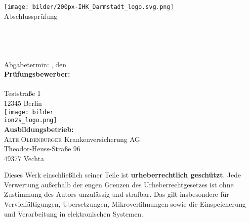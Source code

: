 
\thispagestyle{plain}
\begin{titlepage}

\begin{center}
\texttt{[image: bilder/200px-IHK\_Darmstadt\_logo.svg.png]}\\[1ex]
\Large{Abschlussprüfung \pruefungstermin}\\[3ex]

\Large{\ausbildungsberuf}\\
\LARGE{\betreff}\\[4ex]

\huge{\textbf{\titel}}\\[1.5ex]
\Large{\textbf{\untertitel}}\\[4ex]

\normalsize
Abgabetermin: \ort, den \abgabetermin\\[3em]
\textbf{Prüfungsbewerber:}\\
\autor\\
Teststraße 1\\
12345 Berlin\\[5ex]

\texttt{[image: bilder\\ion2s\_logo.png]}\\[2ex]
\textbf{Ausbildungsbetrieb:}\\
\textsc{Alte Oldenburger} Krankenversicherung AG\\
Theodor-Heuss-Straße 96\\
49377 Vechta\\[5em]
\end{center}

\small
\noindent
Dieses Werk einschließlich seiner Teile ist \textbf{urheberrechtlich geschützt}. 
Jede Verwertung außerhalb der engen Grenzen des Urheberrechtgesetzes ist ohne 
Zustimmung des Autors unzulässig und strafbar. Das gilt insbesondere für 
Vervielfältigungen, Übersetzungen, Mikroverfilmungen sowie die Einspeicherung 
und Verarbeitung in elektronischen Systemen.

\end{titlepage}
